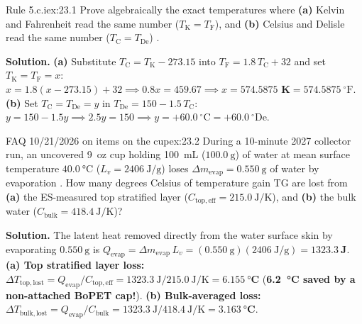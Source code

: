 \begin{workedexample}{Rule 5.c.i}{ex:23.1}
Prove algebraically the exact temperatures where \textbf{(a)} Kelvin and Fahrenheit read the same number ($T_{\mathrm{K}} = T_{\mathrm{F}}$), and \textbf{(b)} Celsius and Delisle read the same number ($T_{\mathrm{C}} = T_{\mathrm{De}}$) .

\textbf{Solution.}
\textbf{(a)} Substitute $T_{\mathrm{C}} = T_{\mathrm{K}} - 273.15$ into $T_{\mathrm{F}} = 1.8\,T_{\mathrm{C}} + 32$ and set $T_{\mathrm{K}} = T_{\mathrm{F}} = x$: $x = 1.8(x - 273.15) + 32 \implies 0.8x = 459.67 \implies x = \mathbf{574.5875\text{ K} = 574.5875\ ^\circ\mathrm{F}}$.
\textbf{(b)} Set $T_{\mathrm{C}} = T_{\mathrm{De}} = y$ in $T_{\mathrm{De}} = 150 - 1.5\,T_{\mathrm{C}}$: $y = 150 - 1.5y \implies 2.5y = 150 \implies y = \mathbf{+60.0\ ^\circ\mathrm{C} = +60.0\ ^\circ\mathrm{De}}$.
\end{workedexample}

\begin{workedexample}{FAQ 10/21/2026 on items on the cup}{ex:23.2}
During a 10-minute 2027 collector run, an uncovered \SI{9}{oz} cup holding \SI{100}{\milli\liter} ($\SI{100.0}{\gram}$) of water at mean surface temperature $\SI{40.0}{\celsius}$ ($L_v = \SI{2406}{\joule\per\gram}$) loses $\Delta m_{\mathrm{evap}} = \SI{0.550}{\gram}$ of water by evaporation . How many degrees Celsius of temperature gain $\mathrm{TG}$ are lost from \textbf{(a)} the ES-measured top stratified layer ($C_{\mathrm{top,eff}} = \SI{215.0}{\joule\per\kelvin}$), and \textbf{(b)} the bulk water ($C_{\mathrm{bulk}} = \SI{418.4}{\joule\per\kelvin}$)?

\textbf{Solution.}
The latent heat removed directly from the water surface skin by evaporating $\SI{0.550}{\gram}$ is $Q_{\mathrm{evap}} = \Delta m_{\mathrm{evap}}\,L_v = (\SI{0.550}{\gram})(\SI{2406}{\joule\per\gram}) = \mathbf{\SI{1323.3}{\joule}}$.
\textbf{(a) Top stratified layer loss:} $\Delta T_{\mathrm{top,lost}} = Q_{\mathrm{evap}}/C_{\mathrm{top,eff}} = \SI{1323.3}{\joule} / \SI{215.0}{\joule\per\kelvin} = \mathbf{\SI{6.155}{\celsius}}$ (\textbf{\SI{6.2}{\celsius} saved by a non-attached BoPET cap!}).
\textbf{(b) Bulk-averaged loss:} $\Delta T_{\mathrm{bulk,lost}} = Q_{\mathrm{evap}}/C_{\mathrm{bulk}} = \SI{1323.3}{\joule} / \SI{418.4}{\joule\per\kelvin} = \mathbf{\SI{3.163}{\celsius}}$.
\end{workedexample}

